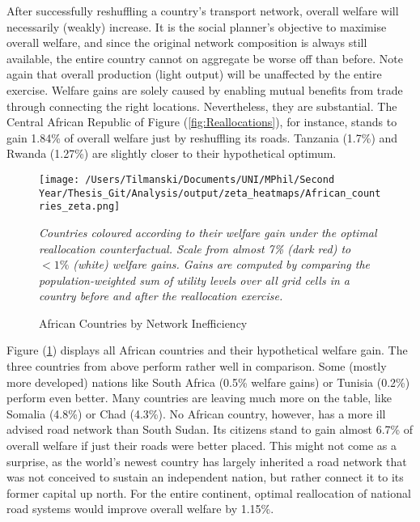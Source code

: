 \documentclass[11pt, oneside]{article}   	%
\let\oldref\ref
\renewcommand{\ref}[1]{(\oldref{#1})}
\newcommand{\mysubcaption}[1]{
\justify
\begin{spacing}{0.7}
\textit{\footnotesize #1}
\end{spacing}}
\begin{document}
After successfully reshuffling a country's transport network, overall welfare will necessarily (weakly) increase. It is the social planner's objective to maximise overall welfare, and since the original network composition is always still available, the entire country cannot on aggregate be worse off than before. Note again that overall production (light output) will be unaffected by the entire exercise. Welfare gains are solely caused by enabling mutual benefits from trade through connecting the right locations. Nevertheless, they are substantial. The Central African Republic of Figure \ref{fig:Reallocations}, for instance, stands to gain 1.84\% of overall welfare just by reshuffling its roads. Tanzania (1.7\%) and Rwanda (1.27\%) are slightly closer to their hypothetical optimum.

\begin{figure}
\centering
\caption{African Countries by Network Inefficiency}
\texttt{[image: /Users/Tilmanski/Documents/UNI/MPhil/Second Year/Thesis\_Git/Analysis/output/zeta\_heatmaps/African\_countries\_zeta.png]}

\label{fig:countries_by_welfare_gain}
\mysubcaption{Countries coloured according to their welfare gain under the optimal reallocation counterfactual. Scale from almost 7\% (dark red) to $<1\%$ (white) welfare gains. Gains are computed by comparing the population-weighted sum of utility levels over all grid cells in a country before and after the reallocation exercise.}
\end{figure}

Figure \ref{fig:countries_by_welfare_gain} displays all African countries and their hypothetical welfare gain. The three countries from above perform rather well in comparison. Some (mostly more developed) nations like South Africa (0.5\% welfare gains) or Tunisia (0.2\%) perform even better. Many countries are leaving much more on the table, like Somalia (4.8\%) or Chad (4.3\%). No African country, however, has a more ill advised road network than South Sudan. Its citizens stand to gain almost 6.7\% of overall welfare if just their roads were better placed. This might not come as a surprise, as the world's newest country has largely inherited a road network that was not conceived to sustain an independent nation, but rather connect it to its former capital up north. For the entire continent, optimal reallocation of national road systems would improve overall welfare by 1.15\%.
\end{document}
